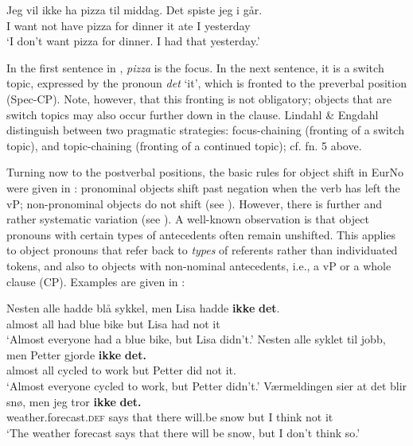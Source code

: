 \documentclass[output=paper]{langscibook}
\begin{document}
\ea \gll Jeg vil ikke ha pizza til middag. Det spiste jeg {i går}.\\
         I want not have pizza for dinner it ate I yesterday\\
	\glt ‘I don’t want pizza for dinner. I had that yesterday.’
	\label{ex:larsson:14}
\z

In the first sentence in , \textit{pizza} is the focus. In the next sentence, it is a switch topic, expressed by the pronoun \textit{det} ‘it’, which is fronted to the preverbal position (Spec-CP). Note, however, that this fronting is not obligatory; objects that are switch topics may also occur further down in the clause. Lindahl \& Engdahl distinguish between two pragmatic strategies: focus-chaining (fronting of a switch topic), and topic-chaining (fronting of a continued topic); cf. fn. 5 above.

Turning now to the postverbal positions, the basic rules for object shift in EurNo were given in : pronominal objects shift past negation when the verb has left the vP; non-pronominal objects do not shift (see ). However, there is further and rather systematic variation (see \citealt{BentzenAnderssen2019}). A well-known observation is that object pronouns with certain types of antecedents often remain unshifted. This applies to object pronouns that refer back to \textit{types} of referents rather than individuated tokens, and also to objects with non-nominal antecedents, i.e., a vP or a whole clause (CP). Examples are given in :

\ea%
	\label{ex:larsson:15}
	\ea
    \label{ex:larsson:15a}
    \gll Nesten alle hadde blå sykkel, men Lisa hadde \textbf{ikke} \textbf{det}.\\
		 almost all had blue bike but Lisa had not it\\
	\glt ‘Almost everyone had a blue bike, but Lisa didn’t.’ 
	\ex \label{ex:larsson:15b}
		\gll Nesten alle syklet til jobb, men Petter gjorde \textbf{ikke} \textbf{det.}\\
		almost all cycled to work but Petter did not it.\\
	\glt ‘Almost everyone cycled to work, but Petter didn’t.’ 
    \ex \label{ex:larsson:15c}
	    \gll Værmeldingen sier at det blir snø, men jeg tror \textbf{ikke} \textbf{det.}\\
			weather.forecast.\textsc{def} says that there will.be snow but I think not it\\
	\glt ‘The weather forecast says that there will be snow, but I don’t think so.’
    \z
\z
\end{document}
